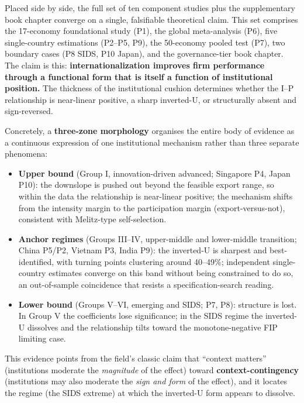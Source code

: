 \documentclass[
  a4paper,
  13pt]{extreport}
\providecommand{\tightlist}{%
  \setlength{\itemsep}{0pt}\setlength{\parskip}{0pt}}
\begin{document}
Placed side by side, the full set of ten component studies plus the
supplementary book chapter converge on a single, falsifiable theoretical
claim. This set comprises the 17-economy foundational study (P1), the
global meta-analysis (P6), five single-country estimations (P2--P5, P9),
the 50-economy pooled test (P7), two boundary cases (P8 SIDS, P10
Japan), and the governance-tier book chapter. The claim is this:
\textbf{internationalization improves firm performance through a
functional form that is itself a function of institutional position.}
The thickness of the institutional cushion determines whether the I--P
relationship is near-linear positive, a sharp inverted-U, or
structurally absent and sign-reversed.

Concretely, a \textbf{three-zone morphology} organises the entire body
of evidence as a continuous expression of one institutional mechanism
rather than three separate phenomena:

\begin{itemize}
\tightlist
\item
  \textbf{Upper bound} (Group I, innovation-driven advanced; Singapore
  P4, Japan P10): the downslope is pushed out beyond the feasible export
  range, so within the data the relationship is near-linear positive;
  the mechanism shifts from the intensity margin to the participation
  margin (export-versus-not), consistent with Melitz-type
  self-selection.
\item
  \textbf{Anchor regimes} (Groups III--IV, upper-middle and lower-middle
  transition; China P5/P2, Vietnam P3, India P9): the inverted-U is
  sharpest and best-identified, with turning points clustering around
  40--49\%; independent single-country estimates converge on this band
  without being constrained to do so, an out-of-sample coincidence that
  resists a specification-search reading.
\item
  \textbf{Lower bound} (Groups V--VI, emerging and SIDS; P7, P8):
  structure is lost. In Group V the coefficients lose significance; in
  the SIDS regime the inverted-U dissolves and the relationship tilts
  toward the monotone-negative FIP limiting case.
\end{itemize}

This evidence points from the field's classic claim that ``context
matters'' (institutions moderate the \emph{magnitude} of the effect)
toward \textbf{context-contingency} (institutions may also moderate the
\emph{sign and form} of the effect), and it locates the regime (the SIDS
extreme) at which the inverted-U form appears to dissolve.
\end{document}
